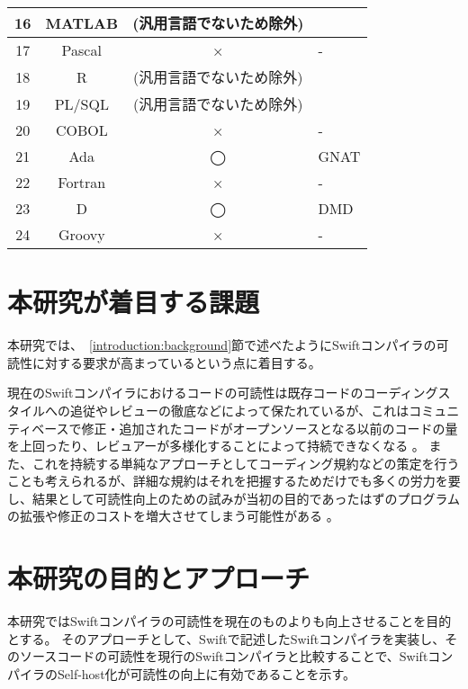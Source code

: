\begin{table}[hb]
\begin{center}
\begin{tabular}{|c|c|c|m{4.5cm}|}
            \hline
            16 & MATLAB & (汎用言語でないため除外) & \\
            \hline
            17 & Pascal & × & - \\
            \hline
            18 & R & (汎用言語でないため除外) & \\
            \hline
            19 & PL/SQL & (汎用言語でないため除外) & \\
            \hline
            20 & COBOL & × & - \\
            \hline
            21 & Ada & ◯ & GNAT \\
            \hline
            22 & Fortran & × & - \\
            \hline
            23 & D & ◯ & DMD \\
            \hline
            24 & Groovy & × & - \\
            \hline
        \end{tabular}
        \label{table:bootstrapping-languages}
    \end{center}
\end{table}


\section{本研究が着目する課題}
\label{introduction:issue}

本研究では、~\ref{introduction:background}節で述べたようにSwiftコンパイラの可読性に対する要求が高まっているという点に着目する。

現在のSwiftコンパイラにおけるコードの可読性は既存コードのコーディングスタイルへの追従やレビューの徹底などによって保たれているが、これはコミュニティベースで修正・追加されたコードがオープンソースとなる以前のコードの量を上回ったり、レビュアーが多様化することによって持続できなくなる
。
また、これを持続する単純なアプローチとしてコーディング規約などの策定を行うことも考えられるが、詳細な規約はそれを把握するためだけでも多くの労力を要し、結果として可読性向上のための試みが当初の目的であったはずのプログラムの拡張や修正のコストを増大させてしまう可能性がある
。


\section{本研究の目的とアプローチ}
\label{introduction:purpose}

本研究ではSwiftコンパイラの可読性を現在のものよりも向上させることを目的とする。
そのアプローチとして、Swiftで記述したSwiftコンパイラを実装し、そのソースコードの可読性を現行のSwiftコンパイラと比較することで、SwiftコンパイラのSelf-host化が可読性の向上に有効であることを示す。

